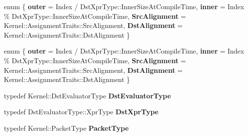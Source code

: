 \begin{DoxyCompactItemize}
\item 
\mbox{\label{struct_eigen_1_1internal_1_1copy__using__evaluator__innervec___complete_unrolling_ae2355f8249cde15cfb9776953da8c9b6}} 
enum \{ {\bfseries outer} = Index / Dst\+Xpr\+Type\+:\+:Inner\+Size\+At\+Compile\+Time, 
{\bfseries inner} = Index \% Dst\+Xpr\+Type\+:\+:Inner\+Size\+At\+Compile\+Time, 
{\bfseries Src\+Alignment} = Kernel\+:\+:Assignment\+Traits\+:\+:Src\+Alignment, 
{\bfseries Dst\+Alignment} = Kernel\+:\+:Assignment\+Traits\+:\+:Dst\+Alignment
 \}
\item 
\mbox{\label{struct_eigen_1_1internal_1_1copy__using__evaluator__innervec___complete_unrolling_af44df5175f81d9e83904324a69962e95}} 
enum \{ {\bfseries outer} = Index / Dst\+Xpr\+Type\+:\+:Inner\+Size\+At\+Compile\+Time, 
{\bfseries inner} = Index \% Dst\+Xpr\+Type\+:\+:Inner\+Size\+At\+Compile\+Time, 
{\bfseries Src\+Alignment} = Kernel\+:\+:Assignment\+Traits\+:\+:Src\+Alignment, 
{\bfseries Dst\+Alignment} = Kernel\+:\+:Assignment\+Traits\+:\+:Dst\+Alignment
 \}
\item 
\mbox{\label{struct_eigen_1_1internal_1_1copy__using__evaluator__innervec___complete_unrolling_a380af5207fb13006b1a69698fd758082}} 
typedef Kernel\+::\+Dst\+Evaluator\+Type {\bfseries Dst\+Evaluator\+Type}
\item 
\mbox{\label{struct_eigen_1_1internal_1_1copy__using__evaluator__innervec___complete_unrolling_a6b3dce8ef2f1568a09bf18dc15a15f81}} 
typedef Dst\+Evaluator\+Type\+::\+Xpr\+Type {\bfseries Dst\+Xpr\+Type}
\item 
\mbox{\label{struct_eigen_1_1internal_1_1copy__using__evaluator__innervec___complete_unrolling_a0941896241a59f3dd7d288ae55fd236d}} 
typedef Kernel\+::\+Packet\+Type {\bfseries Packet\+Type}
\item 
\mbox{\label{struct_eigen_1_1internal_1_1copy__using__evaluator__innervec___complete_unrolling_a380af5207fb13006b1a69698fd758082}} 

\end{DoxyCompactItemize}
